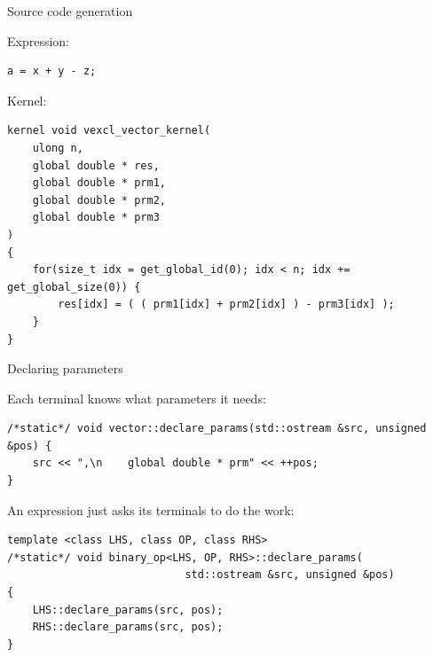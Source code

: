 \documentclass[@BEAMER_OPTIONS@]{beamer}
\begin{document}
\begin{frame}[fragile]{Source code generation}
    \begin{exampleblock}{Expression:}
        \begin{lstlisting}
a = x + y - z;
        \end{lstlisting}
    \end{exampleblock}
    \begin{exampleblock}{Kernel:}
        \begin{lstlisting}
kernel void vexcl_vector_kernel(
    ulong n,
    global double * res,
    global double * prm1,
    global double * prm2,
    global double * prm3
)
{
    for(size_t idx = get_global_id(0); idx < n; idx += get_global_size(0)) {
        res[idx] = ( ( prm1[idx] + prm2[idx] ) - prm3[idx] );
    }
}
        \end{lstlisting}
    \end{exampleblock}
\end{frame}

\begin{frame}[fragile]{Declaring parameters}
    \begin{exampleblock}{Each terminal knows what parameters it needs:}
        \begin{lstlisting}
/*static*/ void vector::declare_params(std::ostream &src, unsigned &pos) {
    src << ",\n    global double * prm" << ++pos;
}
        \end{lstlisting}
    \end{exampleblock}
    \begin{exampleblock}{An expression just asks its terminals to do the work:}
        \begin{lstlisting}[firstnumber=last]
template <class LHS, class OP, class RHS>
/*static*/ void binary_op<LHS, OP, RHS>::declare_params(
                            std::ostream &src, unsigned &pos)
{
    LHS::declare_params(src, pos);
    RHS::declare_params(src, pos);
}
        \end{lstlisting}
    \end{exampleblock}
\end{frame}
\end{document}
